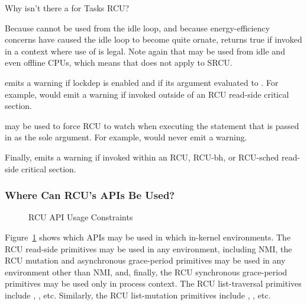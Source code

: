 \QuickQuiz{}
	Why isn't there a  for Tasks RCU?
 \QuickQuizEnd

Because  cannot be used from the idle loop,
and because energy-efficiency concerns have caused the idle loop
to become quite ornate,  returns true if
invoked in a context where use of  is legal.
Note again that  may be used from idle and
even offline CPUs, which means that  does not
apply to SRCU.

 emits a warning if lockdep is enabled and if
its argument evaluated to .
For example,  would emit a
warning if invoked outside of an RCU read-side critical section.

 may be used to force RCU to watch when executing
the statement that is passed in as the sole argument.
For example, 
would never emit a warning.

Finally,   emits a warning if invoked within
an RCU, RCU-bh, or RCU-sched read-side critical section.

\subsubsection{Where Can RCU's APIs Be Used?}
\label{sec:defer:Where Can RCU's APIs Be Used?}

\begin{figure}[tb]
\centering
{}
\caption{RCU API Usage Constraints}
\label{fig:defer:RCU API Usage Constraints}
\end{figure}

Figure~\ref{fig:defer:RCU API Usage Constraints}
shows which APIs may be used in which in-kernel environments.
The RCU read-side primitives may be used in any environment, including NMI,
the RCU mutation and asynchronous grace-period primitives may be used in any
environment other than NMI, and, finally, the RCU synchronous grace-period
primitives may be used only in process context.
The RCU list-traversal primitives include ,
, etc.
Similarly, the RCU list-mutation primitives include
, , etc.


